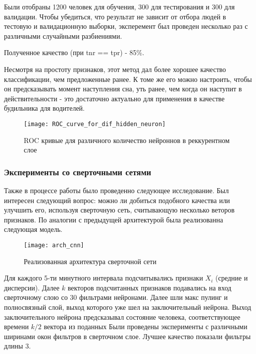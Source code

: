 Были отобраны 1200 человек для обучения, 300 для тестирования и 300 для валидации. 
Чтобы убедиться, что результат не зависит от отбора людей в тестовую и валидационную выборки, эксперемент был проведен несколько раз с различными случайными разбиениями.

Полученное качество (при tnr == tpr) - 85\%. 

Несмотря на простоту признаков, этот метод дал более хорошее качество классификации, чем предложенные ранее. К томе же его можно настроить, чтобы он предсказывать момент наступления сна, уть ранее, чем когда он наступит в действительности - это достаточно актуально для применения в качестве будильника для водителей.

\begin{figure}[h!]
	\begin{center}
		\texttt{[image: ROC\_curve\_for\_dif\_hidden\_neuron]}
		\caption{ROC кривые для различного количество нейроннов в реккурентном слое}
		\label{ris:roc_rnn}
	\end{center}
\end{figure}

\subsubsection{Эксперименты со сверточными сетями}

Также в процессе работы было проведенно следующее исследование. Был интересен следующий вопрос: можно ли добиться подобного качества или улучшить его, используя сверточную сеть, считывающую несколько веторов признаков. По аналогии с предыдущей архитектурой была реализованна следующая модель.  

\begin{figure}[h!]
	\begin{center}
		\texttt{[image: arch\_cnn]}
		\caption{Реализованная архитектура сверточной сети}
		\label{ris:arh_cnn}
	\end{center}
\end{figure}

Для каждого 5-ти минутного интервала подсчитывались признаки $X_i$ (средние и дисперсии). Далее $k$ векторов подсчитанных признаков подавались на вход сверточному слою со 30 фильтрами нейронами. Далее шли макс пулинг и полносвязный слой, выход которого уже шел на заключительный нейрона. Выход заключительного нейрона предсказывал состояние человека, соответствующее времени $k/2$ вектора из поданных Были проведены эксперименты с различными ширинами окон фильтров в сверточном слое. Лучшее качество показали фильтры длины 3.

